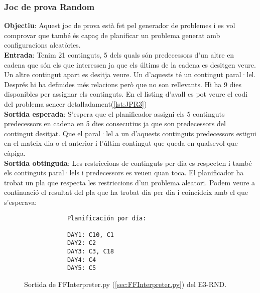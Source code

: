 \documentclass[a4paper]{article}
\begin{document}
	\subsubsection*{Joc de prova Random}
	
	\noindent \textbf{Objectiu}: Aquest joc de prova està fet pel generador de problemes i es vol comprovar que també és capaç de planificar un problema generat amb configuracions aleatòries. \\
	
	\noindent \textbf{Entrada}: Tenim 21 continguts, 5 dels quals són predecessors d'un altre en cadena que són els que interessen ja que els últims de la cadena es desitgen veure. Un altre contingut apart es desitja veure. Un d'aquests té un contingut paral·lel. Després hi ha definides més relacions però que no son rellevants. Hi ha 9 dies disponibles per assignar els continguts. En el listing d'avall es pot veure el codi del problema sencer detalladament(\ref{lst:JPR3}) \\
	
	\noindent \textbf{Sortida esperada}: S'espera que el planificador assigni els 5 continguts predecessors en cadena en 5 dies consecutius ja que son predecessors del contingut desitjat. Que el paral·lel a un d'aquests continguts predecessors estigui en el mateix dia o el anterior i l'últim contingut que queda en qualsevol que càpiga. \\
	
	\noindent \textbf{Sortida obtinguda}: Les restriccions de continguts per dia es respecten i també els continguts paral·lels i predecessors es veuen quan toca. El planificador ha trobat un pla que respecta les restriccions d'un problema aleatori.  Podem veure a continuació el resultat del pla que ha trobat dia per dia i coincideix amb el que s'esperava:\\
	
	\begin{figure}[H]
		\centering
		\begin{verbatim}
			Planificación por día:
			
			DAY1: C10, C1
			DAY2: C2
			DAY3: C3, C18
			DAY4: C4
			DAY5: C5
		\end{verbatim}
		\caption{Sortida de FFInterpreter.py (\ref{sec:FFInterpreter.py}) del E3-RND.}
	\end{figure}
	
\end{document}
